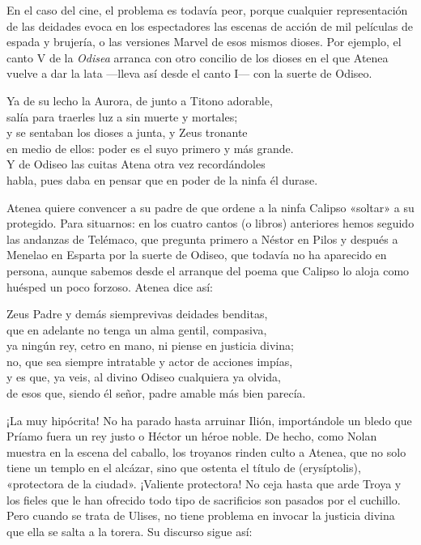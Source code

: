 En el caso del cine, el problema es todavía peor, porque cualquier representación de las deidades evoca en los espectadores las escenas de acción de mil películas de espada y brujería, o las versiones Marvel de esos mismos dioses.
Por ejemplo, el canto V de la \emph{Odisea} arranca con otro concilio de los dioses en el que Atenea vuelve a dar la lata ---lleva así desde el canto I--- con la suerte de Odiseo.

\begin{versocita}
Ya de su lecho la Aurora, de junto a Titono adorable,\\
salía para traerles luz a sin muerte y mortales;\\
y se sentaban los dioses a junta, y Zeus tronante\\
en medio de ellos: poder es el suyo primero y más grande.\\
Y de Odiseo las cuitas Atena otra vez recordándoles\\
habla, pues daba en pensar que en poder de la ninfa él durase.
\end{versocita}

Atenea quiere convencer a su padre de que ordene a la ninfa Calipso «soltar» a su protegido. Para situarnos: en los cuatro cantos (o libros) anteriores hemos seguido las andanzas de Telémaco, que pregunta primero a Néstor en Pilos y después a Menelao en Esparta por la suerte de Odiseo, que todavía no ha aparecido en persona, aunque sabemos desde el arranque del poema que Calipso lo aloja como huésped un poco forzoso. Atenea dice así:

\begin{versocita}
Zeus Padre y demás siemprevivas deidades benditas,\\
que en adelante no tenga un alma gentil, compasiva,\\
ya ningún rey, cetro en mano, ni piense en justicia divina;\\
no, que sea siempre intratable y actor de acciones impías,\\
y es que, ya veis, al divino Odiseo cualquiera ya olvida,\\
de esos que, siendo él señor, padre amable más bien parecía.
\end{versocita}

¡La muy hipócrita! No ha parado hasta arruinar Ilión, importándole un bledo que Príamo fuera un rey justo o Héctor un héroe noble. De hecho, como Nolan muestra en la escena del caballo, los troyanos rinden culto a Atenea, que no solo tiene un templo en el alcázar, sino que ostenta el título de  (erysíptolis), «protectora de la ciudad». ¡Valiente protectora! No ceja hasta que arde Troya y los fieles que le han ofrecido todo tipo de sacrificios son pasados por el cuchillo. Pero cuando se trata de Ulises, no tiene problema en invocar la justicia divina que ella se salta a la torera. Su discurso sigue así:


